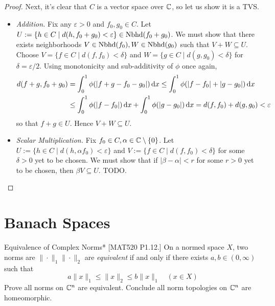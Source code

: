 \begin{proof}
    Next, it's clear that \(C\) is a vector space over \(\mathbb{C}\), so let us show it is a TVS. 
    \begin{itemize}
        \itemsep0em
        \item \emph{Addition.} Fix any \(\varepsilon > 0\) and \(f_0, g_0 \in C\). Let \(U := \{h \in C \mid d(h, f_0 + g_0) < \varepsilon\} \in \operatorname{Nbhd}(f_0 + g_0)\). We must show that there exists neighborhoods \(V \in \operatorname{Nbhd}(f_0), W \in \operatorname{Nbhd}(g_0)\) such that \(V + W \subseteq U\). Choose \(V = \{f \in C \mid d(f, f_0) < \delta\}\) and \(W = \{g \in C \mid d(g, g_0) < \delta\}\) for \(\delta = \varepsilon / 2\). Using monotonicity and sub-additivity of \(\phi\) once again, 
        \begin{align*}
            d(f + g, f_0 + g_0) 
            &= \int_0^1 \phi(|f+g - f_0 - g_0|) \, \mathrm{d}x
            \leq \int_0^1 \phi(|f-f_0| + |g - g_0|) \, \mathrm{d}x \\
            &\leq \int_0^1 \phi(|f - f_0|) \, \mathrm{d}x + \int_0^1 \phi(|g - g_0|) \, \mathrm{d}x
            = d(f, f_0) + d(g, g_0)
            < \varepsilon
        \end{align*}
        so that \(f+g \in U\). Hence \(V + W \subseteq U\). 
        \item \emph{Scalar Multiplication.} Fix \(f_0 \in C, \alpha \in \mathbb{C} \setminus \{0\}\). Let \(U := \{h \in C \mid d(h, \alpha f_0) < \varepsilon\}\) and \(V := \{f \in C \mid d(f, f_0) < \delta\}\) for some \(\delta > 0\) yet to be chosen. We must show that if \(|\beta - \alpha| < r\) for some \(r > 0\) yet to be chosen, then \(\beta V \subseteq U\). TODO. 
    \end{itemize}
\end{proof}

\newpage
\section{Banach Spaces}

\begin{problem}{Equivalence of Complex Norms}*
    [MAT520 P1.12.] On a normed space \(X\), two norms are \(\|\cdot\|_1 \|\cdot\|_2\) are \emph{equivalent} if and only if there exists \(a, b \in (0, \infty)\) such that 
    \[
        a\|x\|_1 \leq \|x\|_2 \leq b\|x\|_1 \quad (x \in X)
    \]
    Prove all norms on \(\mathbb{C}^n\) are equivalent. Conclude all norm topologies on \(\mathbb{C}^n\) are homeomorphic. 
\end{problem}

